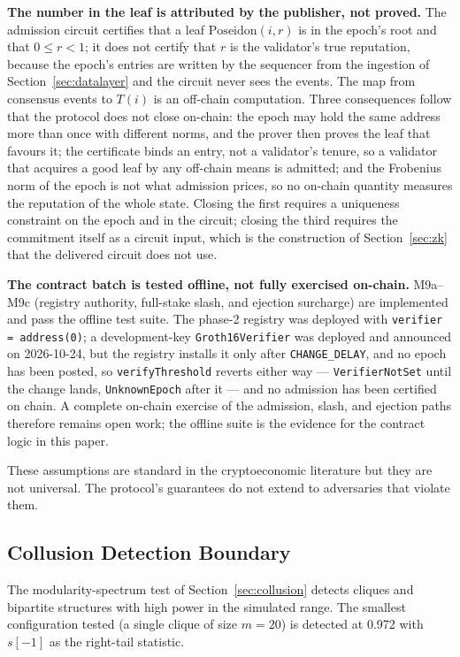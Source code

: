 \documentclass[11pt,a4paper]{article}
\numberwithin{equation}{section}
\numberwithin{table}{section}
\begin{document}
\textbf{The number in the leaf is attributed by the publisher, not proved.} The admission circuit certifies that a leaf $\mathrm{Poseidon}(i,r)$ is in the epoch's root and that $0 \leq r < 1$; it does not certify that $r$ is the validator's true reputation, because the epoch's entries are written by the sequencer from the ingestion of Section~\ref{sec:datalayer} and the circuit never sees the events. The map from consensus events to $T(i)$ is an off-chain computation. Three consequences follow that the protocol does not close on-chain: the epoch may hold the same address more than once with different norms, and the prover then proves the leaf that favours it; the certificate binds an entry, not a validator's tenure, so a validator that acquires a good leaf by any off-chain means is admitted; and the Frobenius norm of the epoch is not what admission prices, so no on-chain quantity measures the reputation of the whole state. Closing the first requires a uniqueness constraint on the epoch and in the circuit; closing the third requires the commitment itself as a circuit input, which is the construction of Section~\ref{sec:zk} that the delivered circuit does not use.

\textbf{The contract batch is tested offline, not fully exercised on-chain.} M9a--M9c (registry authority, full-stake slash, and ejection surcharge) are implemented and pass the offline test suite. The phase-2 registry was deployed with \texttt{verifier = address(0)}; a development-key \texttt{Groth16Verifier} was deployed and announced on 2026-10-24, but the registry installs it only after \texttt{CHANGE\_DELAY}, and no epoch has been posted, so \texttt{verifyThreshold} reverts either way --- \texttt{VerifierNotSet} until the change lands, \texttt{UnknownEpoch} after it --- and no admission has been certified on chain. A complete on-chain exercise of the admission, slash, and ejection paths therefore remains open work; the offline suite is the evidence for the contract logic in this paper.

These assumptions are standard in the cryptoeconomic literature but they are not universal. The protocol's guarantees do not extend to adversaries that violate them.

\subsection{Collusion Detection Boundary}
The modularity-spectrum test of Section~\ref{sec:collusion} detects cliques and bipartite structures with high power in the simulated range. The smallest configuration tested (a single clique of size $m=20$) is detected at 0.972 with $s[-1]$ as the right-tail statistic.
\end{document}
